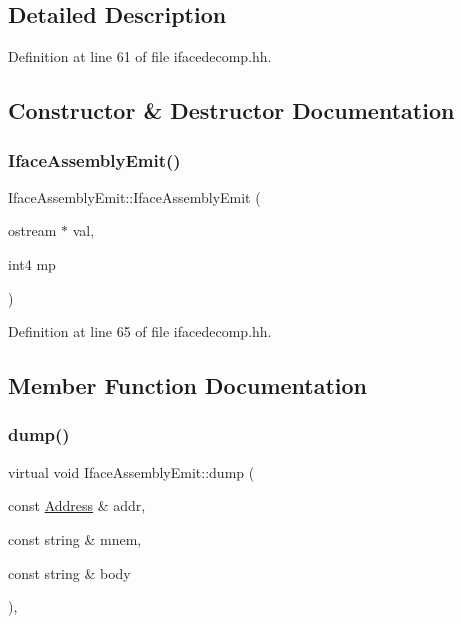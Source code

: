 \subsection{Detailed Description}


Definition at line 61 of file ifacedecomp.\+hh.



\subsection{Constructor \& Destructor Documentation}
\mbox{\label{class_iface_assembly_emit_a94de5aaefab18cfb549437be4b5d356b}} 
\subsubsection{\texorpdfstring{IfaceAssemblyEmit()}{IfaceAssemblyEmit()}}
{\footnotesize\ttfamily Iface\+Assembly\+Emit\+::\+Iface\+Assembly\+Emit (\begin{DoxyParamCaption}\item[{ostream $\ast$}]{val,  }\item[{int4}]{mp }\end{DoxyParamCaption})\hspace{0.3cm}{\ttfamily [inline]}}



Definition at line 65 of file ifacedecomp.\+hh.



\subsection{Member Function Documentation}
\mbox{\label{class_iface_assembly_emit_abacb06a4f3972d21d3c93c5d5a170f73}} 
\subsubsection{\texorpdfstring{dump()}{dump()}}
{\footnotesize\ttfamily virtual void Iface\+Assembly\+Emit\+::dump (\begin{DoxyParamCaption}\item[{const \mbox{\hyperlink{class_address}{Address}} \&}]{addr,  }\item[{const string \&}]{mnem,  }\item[{const string \&}]{body }\end{DoxyParamCaption})\hspace{0.3cm}{\ttfamily [inline]}, {\ttfamily [virtual]}}



